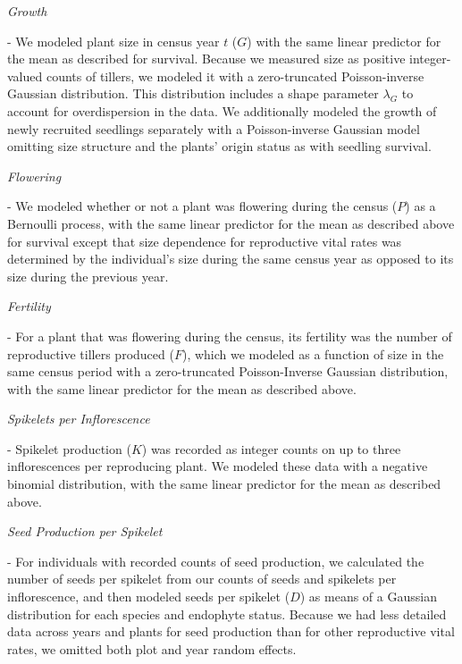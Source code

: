 \documentclass[lineno,sn-nature]{sn-jnl}%
\providecommand{\DIFadd}[1]{{\protect\color{blue}#1}} %
\providecommand{\DIFadd}[1]{{\protect\color{blue}\uwave{#1}}} %
\begin{document}
\begin{appendices}
{}


\emph{\DIFadd{Growth}} \DIFadd{- We modeled plant size in census year $t$ ($G$) with the same linear predictor for the mean as described for survival.
Because we measured size as positive integer-valued counts of tillers, we modeled it with a zero-truncated Poisson-inverse Gaussian distribution.
This distribution includes a shape parameter $\lambda_G$ to account for overdispersion in the data.
We additionally modeled the growth of newly recruited seedlings separately with a Poisson-inverse Gaussian model omitting size structure and the plants' origin status as with seedling survival.

}

\emph{\DIFadd{Flowering}} \DIFadd{- We modeled whether or not a plant was flowering during the census ($P$) as a Bernoulli process, with the same linear predictor for the mean as described above for survival except that size dependence for reproductive vital rates was determined by the individual's size during the same census year as opposed to its size during the previous year.

}

\emph{\DIFadd{Fertility}} \DIFadd{- For a plant that was flowering during the census, its fertility was the number of reproductive tillers produced ($F$), which we modeled as a function of size in the same census period with a zero-truncated Poisson-Inverse Gaussian distribution, with the same linear predictor for the mean as described above. 

}

\emph{\DIFadd{Spikelets per Inflorescence}} \DIFadd{- Spikelet production ($K$) was recorded as integer counts on up to three inflorescences per reproducing plant.
We modeled these data with a negative binomial distribution, with the same linear predictor for the mean as described above. 

}

\emph{\DIFadd{Seed Production per Spikelet}} \DIFadd{- For individuals with recorded counts of seed production, we calculated the number of seeds per spikelet from our counts of seeds and spikelets per inflorescence, and then modeled seeds per spikelet ($D$) as means of a Gaussian distribution for each species and endophyte status. 
Because we had less detailed data across years and plants for seed production than for other reproductive vital rates, we omitted both plot and year random effects. 

}


\end{appendices}
\end{document}
